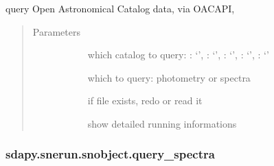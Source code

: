 \documentclass[letterpaper,10pt,english]{sphinxmanual}
\begin{document}
\begin{fulllineitems}
\begin{fulllineitems}
\label{\detokenize{generated/sdapy.snerun.snobject.query_oac:sdapy.snerun.snobject.query_oac}}
query Open Astronomical Catalog data, 
via OACAPI, 
\begin{quote}\begin{description}
\item[{Parameters}] \leavevmode\begin{description}
\item[{}] \leavevmode{[}\sphinxtitleref{str}{]}
which catalog to query: 
  : ‘’,
  : ‘’,
 : ‘’,
  : ‘’,
  : ‘’

\item[{}] \leavevmode{[}\sphinxtitleref{str}{]}
which to query: photometry or spectra

\item[{}] \leavevmode{[}\sphinxtitleref{bool}{]}
if file exists, redo or read it

\item[{}] \leavevmode
show detailed running informations

\end{description}

\end{description}\end{quote}

\end{fulllineitems}



\subsubsection{sdapy.snerun.snobject.query\_spectra}
\label{\detokenize{generated/sdapy.snerun.snobject.query_spectra:sdapy-snerun-snobject-query-spectra}}\label{\detokenize{generated/sdapy.snerun.snobject.query_spectra::doc}}


\end{fulllineitems}
\end{document}
